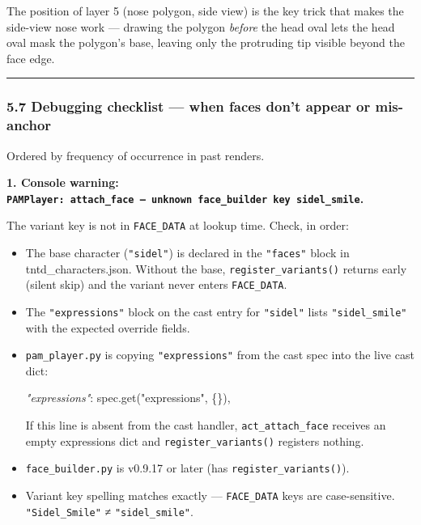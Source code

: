 \documentclass[
  11pt,
]{book}
\newenvironment{Shaded}{}{}
\newcommand{\CommentTok}[1]{\textcolor[rgb]{0.38,0.63,0.69}{\textit{#1}}}
\newcommand{\NormalTok}[1]{#1}
\newcommand{\StringTok}[1]{\textcolor[rgb]{0.25,0.44,0.63}{#1}}
\begin{document}
The position of layer 5 (nose polygon, side view) is the key trick that
makes the side-view nose work --- drawing the polygon \emph{before} the
head oval lets the head oval mask the polygon's base, leaving only the
protruding tip visible beyond the face edge.

\begin{center}\rule{0.5\linewidth}{0.5pt}\end{center}

\subsubsection{5.7 Debugging checklist --- when faces don't appear or
mis-anchor}\label{debugging-checklist-when-faces-dont-appear-or-mis-anchor}

Ordered by frequency of occurrence in past renders.

\textbf{1. Console warning:
\texttt{PAMPlayer:\ attach\_face\ —\ unknown\ face\_builder\ key\ \textquotesingle{}sidel\_smile\textquotesingle{}}.}

The variant key is not in \texttt{FACE\_DATA} at lookup time. Check, in
order:

\begin{itemize}
\item
  The base character (\texttt{"sidel"}) is declared in the
  \texttt{"faces"} block in tntd\_characters.json. Without the base,
  \texttt{register\_variants()} returns early (silent skip) and the
  variant never enters \texttt{FACE\_DATA}.
\item
  The \texttt{"expressions"} block on the cast entry for
  \texttt{"sidel"} lists \texttt{"sidel\_smile"} with the expected
  override fields.
\item
  \texttt{pam\_player.py} is copying \texttt{"expressions"} from the
  cast spec into the live cast dict:

\begin{Shaded}
\begin{Highlighting}[]
\CommentTok{"expressions"}\NormalTok{: spec.get(}\StringTok{"expressions"}\NormalTok{, \{\}),}
\end{Highlighting}
\end{Shaded}

  If this line is absent from the cast handler,
  \texttt{act\_attach\_face} receives an empty expressions dict and
  \texttt{register\_variants()} registers nothing.
\item
  \texttt{face\_builder.py} is v0.9.17 or later (has
  \texttt{register\_variants()}).
\item
  Variant key spelling matches exactly --- \texttt{FACE\_DATA} keys are
  case-sensitive. \texttt{"Sidel\_Smile"} ≠ \texttt{"sidel\_smile"}.
\end{itemize}
\end{document}
